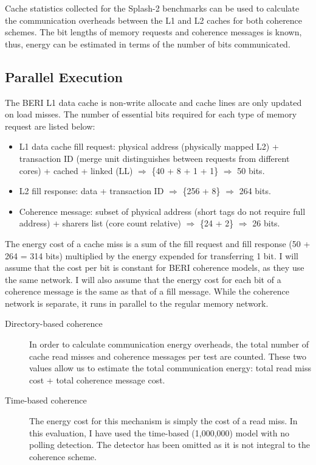 		Cache statistics collected for the Splash-2 benchmarks can be used to calculate the communication overheads between the L1 and L2 caches for both coherence schemes. The bit lengths of memory requests and coherence messages is known, thus, energy can be estimated in terms of the number of bits communicated.
	
		\subsection{Parallel Execution}
			The BERI L1 data cache is non-write allocate and cache lines are only updated on load misses. The number of essential bits required for each type of memory request are listed below:
			\begin{itemize}
				\item L1 data cache fill request: physical address (physically mapped L2) + transaction ID (merge unit distinguishes between requests from different cores) + cached + linked (LL) $\Rightarrow$ \{40 + 8 + 1 + 1\} $\Rightarrow$ 50 bits.
				\item L2 fill response: data + transaction ID $\Rightarrow$ \{256 + 8\} $\Rightarrow$ 264 bits.
				\item Coherence message: subset of physical address (short tags do not require full address) + sharers list (core count relative) $\Rightarrow$ \{24 + 2\} $\Rightarrow$ 26 bits.
			\end{itemize}
			
			The energy cost of a cache miss is a sum of the fill request and fill response (50 + 264 = 314 bits) multiplied by the energy expended for transferring 1 bit. I will assume that the cost per bit is constant for BERI coherence models, as they use the same network. I will also assume that the energy cost for each bit of a coherence message is the same as that of a fill message. While the coherence network is separate, it runs in parallel to the regular memory network.
			
			\begin{description}
				\item [Directory-based coherence] In order to calculate communication energy overheads, the total number of cache read misses and coherence messages per test are counted. These two values allow us to estimate the total communication energy: total read miss cost + total coherence message cost.
				\item [Time-based coherence] The energy cost for this mechanism is simply the cost of a read miss. In this evaluation, I have used the time-based (1,000,000) model with no polling detection. The detector has been omitted as it is not integral to the coherence scheme.
			\end{description}

